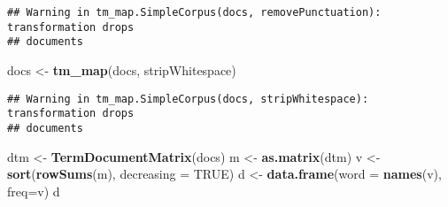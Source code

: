\documentclass[]{article}
\newenvironment{Shaded}{\begin{snugshade}}{\end{snugshade}}
\newcommand{\DataTypeTok}[1]{\textcolor[rgb]{0.13,0.29,0.53}{#1}}
\newcommand{\KeywordTok}[1]{\textcolor[rgb]{0.13,0.29,0.53}{\textbf{#1}}}
\newcommand{\NormalTok}[1]{#1}
\newcommand{\OtherTok}[1]{\textcolor[rgb]{0.56,0.35,0.01}{#1}}
\newcommand{\StringTok}[1]{\textcolor[rgb]{0.31,0.60,0.02}{#1}}
\begin{document}
\begin{verbatim}
## Warning in tm_map.SimpleCorpus(docs, removePunctuation): transformation drops
## documents
\end{verbatim}

\begin{Shaded}
\begin{Highlighting}[]
\NormalTok{docs <-}\StringTok{ }\KeywordTok{tm_map}\NormalTok{(docs, stripWhitespace)}
\end{Highlighting}
\end{Shaded}

\begin{verbatim}
## Warning in tm_map.SimpleCorpus(docs, stripWhitespace): transformation drops
## documents
\end{verbatim}

\begin{Shaded}
\begin{Highlighting}[]
\NormalTok{dtm <-}\StringTok{ }\KeywordTok{TermDocumentMatrix}\NormalTok{(docs)}
\NormalTok{m <-}\StringTok{ }\KeywordTok{as.matrix}\NormalTok{(dtm)}
\NormalTok{v <-}\StringTok{ }\KeywordTok{sort}\NormalTok{(}\KeywordTok{rowSums}\NormalTok{(m), }\DataTypeTok{decreasing =} \OtherTok{TRUE}\NormalTok{)}
\NormalTok{d <-}\StringTok{ }\KeywordTok{data.frame}\NormalTok{(}\DataTypeTok{word =} \KeywordTok{names}\NormalTok{(v), }\DataTypeTok{freq=}\NormalTok{v)}
\NormalTok{d}
\end{Highlighting}
\end{Shaded}
\end{document}
